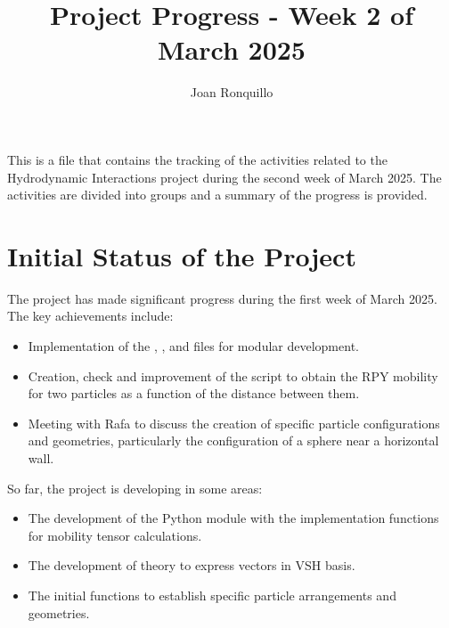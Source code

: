 \documentclass[12pt]{article}
\begin{document}
\author{Joan Ronquillo}

\title{Project Progress - Week 2 of March 2025}
\maketitle

This is a file that contains the tracking of the activities
related to the Hydrodynamic Interactions project during the
second week of March 2025. The activities are divided into
groups and a summary of the progress is provided.

\section{Initial Status of the Project}
The project has made significant progress during the first week of March 2025. The key achievements include:
\begin{itemize}
    \item Implementation of the , , and  files for modular development.
    \item Creation, check and improvement of the  script to obtain the RPY mobility for two particles as a function of the distance between them.
    \item Meeting with Rafa to discuss the creation of specific particle configurations and geometries, particularly the configuration of a sphere near a horizontal wall.
\end{itemize}
So far, the project is developing in some areas:
\begin{itemize}
    \item The development of the Python module with the implementation functions for mobility tensor calculations.
    \item The development of theory to express vectors in VSH basis.
    \item The initial functions to establish specific particle arrangements and geometries.
\end{itemize}
\end{document}
